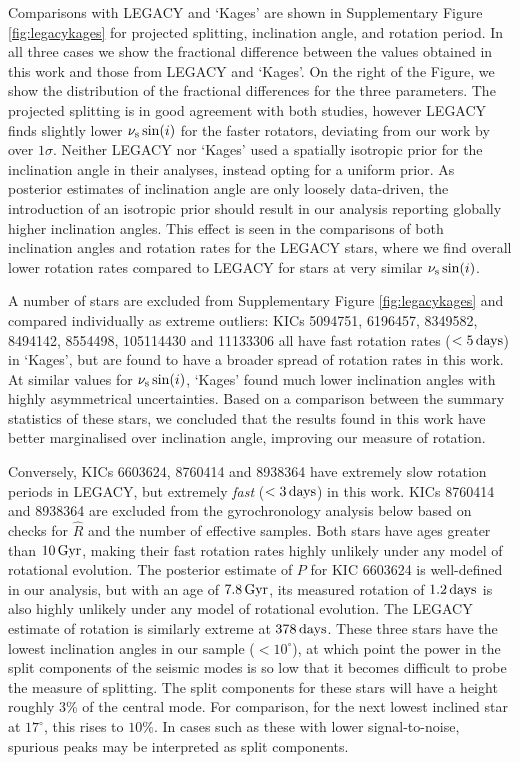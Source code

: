 Comparisons with LEGACY and `Kages' are shown in Supplementary Figure \ref{fig:legacykages} for projected splitting, inclination angle, and rotation period. In all three cases we show the fractional difference between the values obtained in this work and those from LEGACY and `Kages'. On the right of the Figure, we show the distribution of the fractional differences for the three parameters.
The projected splitting is in good agreement with both studies, however LEGACY finds slightly lower $\nu_{\rm s}\sin(i)$ for the faster rotators, deviating from our work by over $1\sigma$. Neither LEGACY nor `Kages' used a spatially isotropic prior for the inclination angle in their analyses, instead opting for a uniform prior. As posterior estimates of inclination angle are only loosely data-driven, the introduction of an isotropic prior should result in our analysis reporting globally higher inclination angles. This effect is seen in the comparisons of both inclination angles and rotation rates for the LEGACY stars, where we find overall lower rotation rates compared to LEGACY for stars at very similar $\nu_{\rm s}\sin(i)$.

A number of stars are excluded from Supplementary Figure \ref{fig:legacykages} and compared individually as extreme outliers: KICs 5094751, 6196457, 8349582, 8494142, 8554498, 105114430 and 11133306 all have fast rotation rates ($<5\, \rm days$) in `Kages', but are found to have a broader spread of rotation rates in this work. At similar values for $\nu_{\rm s}\sin(i)$, `Kages' found much lower inclination angles with highly asymmetrical uncertainties. Based on a comparison between the summary statistics of these stars, we concluded that the results found in this work have better marginalised over inclination angle, improving our measure of rotation.

Conversely, KICs 6603624, 8760414 and 8938364 have extremely slow rotation periods in LEGACY, but extremely \textit{fast} ($<3\, \rm {days}$) in this work. KICs 8760414 and 8938364 are excluded from the gyrochronology analysis below based on checks for $\hat{R}$ and the number of effective samples. Both stars have ages greater than $10\, \rm Gyr$, making their fast rotation rates highly unlikely under any model of rotational evolution. The posterior estimate of $P$ for KIC 6603624 is well-defined in our analysis, but with an age of $7.8\, \rm Gyr$, its measured rotation of $1.2\, \rm days$ is also highly unlikely under any model of rotational evolution. The LEGACY estimate of rotation is similarly extreme at $378\, \rm days$. These three stars have the lowest inclination angles in our sample ($< 10^\circ$), at which point the power in the split components of the seismic modes is so low that it becomes difficult to probe the measure of splitting. The split components for these stars will have a height roughly 3\% of the central mode. For comparison, for the next lowest inclined star at $17^\circ$, this rises to $10\%$. In cases such as these with lower signal-to-noise, spurious peaks may be interpreted as split components.\\

